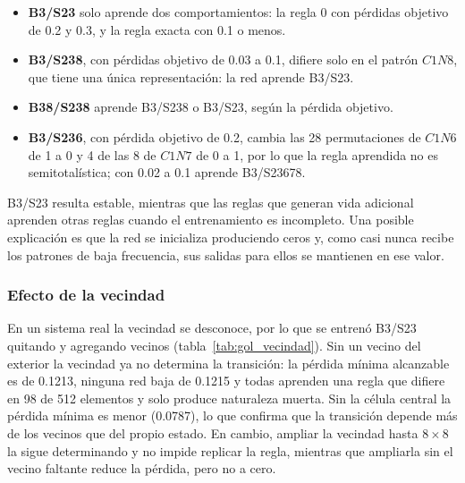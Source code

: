\begin{itemize}
	\item \textbf{B3/S23} solo aprende dos comportamientos: la regla 0 con pérdidas objetivo de 0.2 y 0.3, y la regla exacta con 0.1 o menos.
	\item \textbf{B3/S238}, con pérdidas objetivo de 0.03 a 0.1, difiere solo en el patrón $C1N8$, que tiene una única representación: la red aprende B3/S23.
	\item \textbf{B38/S238} aprende B3/S238 o B3/S23, según la pérdida objetivo.
	\item \textbf{B3/S236}, con pérdida objetivo de 0.2, cambia las 28 permutaciones de $C1N6$ de 1 a 0 y 4 de las 8 de $C1N7$ de 0 a 1, por lo que la regla aprendida no es semitotalística; con 0.02 a 0.1 aprende B3/S23678.
\end{itemize}

B3/S23 resulta estable, mientras que las reglas que generan vida adicional aprenden otras reglas cuando el entrenamiento es incompleto. Una posible explicación es que la red se inicializa produciendo ceros y, como casi nunca recibe los patrones de baja frecuencia, sus salidas para ellos se mantienen en ese valor.


\subsubsection{Efecto de la vecindad}
En un sistema real la vecindad se desconoce, por lo que se entrenó B3/S23 quitando y agregando vecinos (tabla~\ref{tab:gol_vecindad}). Sin un vecino del exterior la vecindad ya no determina la transición: la pérdida mínima alcanzable es de 0.1213, ninguna red baja de 0.1215 y todas aprenden una regla que difiere en 98 de 512 elementos y solo produce naturaleza muerta. Sin la célula central la pérdida mínima es menor (0.0787), lo que confirma que la transición depende más de los vecinos que del propio estado. En cambio, ampliar la vecindad hasta $8\times8$ la sigue determinando y no impide replicar la regla, mientras que ampliarla sin el vecino faltante reduce la pérdida, pero no a cero.

